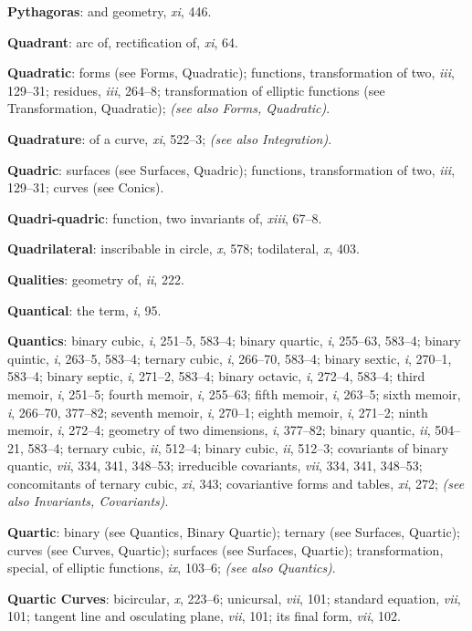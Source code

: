 \documentclass[11pt,a4paper]{article}
\newcommand{\IndexEntry}[1]{\textbf{#1}}
\newcommand{\SeeAlso}[1]{\textit{(see also #1)}}
\newcommand{\V}[1]{\textit{#1}} %
\begin{document}
\IndexEntry{Pythagoras}: and geometry, \V{xi}, 446.

\IndexEntry{Quadrant}: arc of, rectification of, \V{xi}, 64.

\IndexEntry{Quadratic}: forms (see Forms, Quadratic); functions, transformation of two, \V{iii}, 129--31; residues, \V{iii}, 264--8; transformation of elliptic functions (see Transformation, Quadratic); \SeeAlso{Forms, Quadratic}.

\IndexEntry{Quadrature}: of a curve, \V{xi}, 522--3; \SeeAlso{Integration}.

\IndexEntry{Quadric}: surfaces (see Surfaces, Quadric); functions, transformation of two, \V{iii}, 129--31; curves (see Conics).

\IndexEntry{Quadri-quadric}: function, two invariants of, \V{xiii}, 67--8.

\IndexEntry{Quadrilateral}: inscribable in circle, \V{x}, 578; todilateral, \V{x}, 403.

\IndexEntry{Qualities}: geometry of, \V{ii}, 222.

\IndexEntry{Quantical}: the term, \V{i}, 95.

\IndexEntry{Quantics}: binary cubic, \V{i}, 251--5, 583--4; binary quartic, \V{i}, 255--63, 583--4; binary quintic, \V{i}, 263--5, 583--4; ternary cubic, \V{i}, 266--70, 583--4; binary sextic, \V{i}, 270--1, 583--4; binary septic, \V{i}, 271--2, 583--4; binary octavic, \V{i}, 272--4, 583--4; third memoir, \V{i}, 251--5; fourth memoir, \V{i}, 255--63; fifth memoir, \V{i}, 263--5; sixth memoir, \V{i}, 266--70, 377--82; seventh memoir, \V{i}, 270--1; eighth memoir, \V{i}, 271--2; ninth memoir, \V{i}, 272--4; geometry of two dimensions, \V{i}, 377--82; binary quantic, \V{ii}, 504--21, 583--4; ternary cubic, \V{ii}, 512--4; binary cubic, \V{ii}, 512--3; covariants of binary quantic, \V{vii}, 334, 341, 348--53; irreducible covariants, \V{vii}, 334, 341, 348--53; concomitants of ternary cubic, \V{xi}, 343; covariantive forms and tables, \V{xi}, 272; \SeeAlso{Invariants, Covariants}.

\IndexEntry{Quartic}: binary (see Quantics, Binary Quartic); ternary (see Surfaces, Quartic); curves (see Curves, Quartic); surfaces (see Surfaces, Quartic); transformation, special, of elliptic functions, \V{ix}, 103--6; \SeeAlso{Quantics}.

\IndexEntry{Quartic Curves}: bicircular, \V{x}, 223--6; unicursal, \V{vii}, 101; standard equation, \V{vii}, 101; tangent line and osculating plane, \V{vii}, 101; its final form, \V{vii}, 102.
\end{document}
